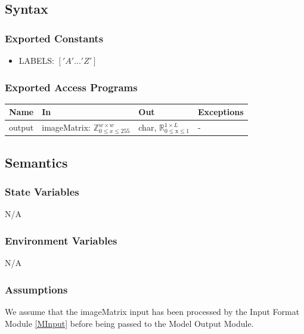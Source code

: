 \documentclass[12pt, titlepage]{article}
\begin{document}
\subsection{Syntax}

\subsubsection{Exported Constants}

\begin{itemize}
  \item LABELS: ${['A'...'Z']}$
\end{itemize}

\subsubsection{Exported Access Programs}

\begin{center}
\begin{tabular}{p{2cm} p{4cm} p{4cm} p{2cm}}
\hline
\textbf{Name} & \textbf{In} & \textbf{Out} & \textbf{Exceptions} \\
\hline
output & imageMatrix: $\mathbb{Z}^{w \times w}_{0 \le x \le 255}$ & char, $\mathbb{R}_{\text{0} \leq \text{x} \leq \text{1}}^{1 \times L}$ & - \\
\hline
\end{tabular}
\end{center}

\subsection{Semantics}

\subsubsection{State Variables}

N/A

\subsubsection{Environment Variables}

N/A

\subsubsection{Assumptions}

We assume that the imageMatrix input has been processed by the Input Format
Module \ref{MInput} before being passed to the Model Output Module.
\end{document}
